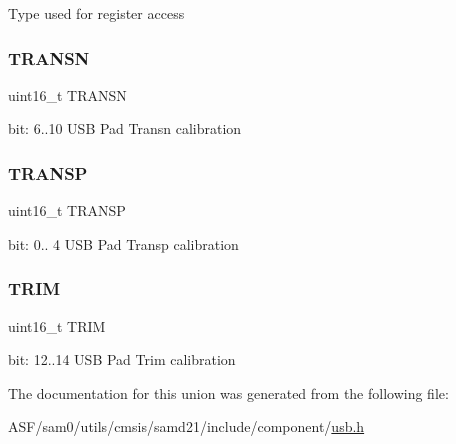 Type used for register access \mbox{\label{union_u_s_b___p_a_d_c_a_l___type_ad282de1ba9436aa621bb90d14ff88eb6}} 
\subsubsection{\texorpdfstring{TRANSN}{TRANSN}}
{\footnotesize\ttfamily uint16\+\_\+t T\+R\+A\+N\+SN}

bit\+: 6..10 U\+SB Pad Transn calibration \mbox{\label{union_u_s_b___p_a_d_c_a_l___type_a287952231554cff5ea1c3734346568d1}} 
\subsubsection{\texorpdfstring{TRANSP}{TRANSP}}
{\footnotesize\ttfamily uint16\+\_\+t T\+R\+A\+N\+SP}

bit\+: 0.. 4 U\+SB Pad Transp calibration \mbox{\label{union_u_s_b___p_a_d_c_a_l___type_a990531a7c9bfbd0280175451d35ad875}} 
\subsubsection{\texorpdfstring{TRIM}{TRIM}}
{\footnotesize\ttfamily uint16\+\_\+t T\+R\+IM}

bit\+: 12..14 U\+SB Pad Trim calibration 

The documentation for this union was generated from the following file\+:\begin{DoxyCompactItemize}
\item 
A\+S\+F/sam0/utils/cmsis/samd21/include/component/\mbox{\hyperlink{component_2usb_8h}{usb.\+h}}\end{DoxyCompactItemize}
